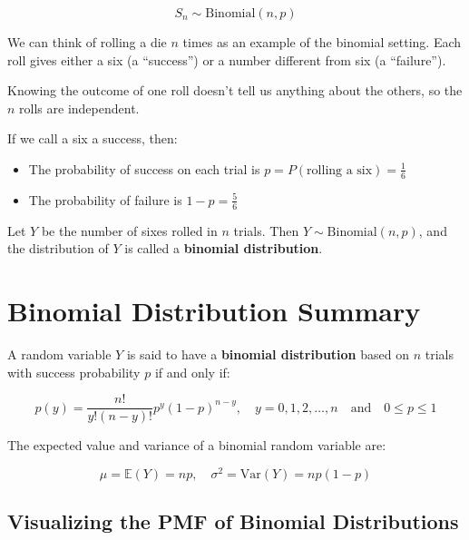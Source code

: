 \[
S_n \sim \text{Binomial}(n, p)
\]
\medskip
\begin{tcolorbox}[title=Example: Binomial Distribution from Die Rolls,
  colback=blue!5, colframe=blue!40!black, coltitle=black,
  colbacktitle=blue!10!white, fonttitle=\bfseries, breakable]

We can think of rolling a die \( n \) times as an example of the binomial setting. Each roll gives either a six (a “success”) or a number different from six (a “failure”).

Knowing the outcome of one roll doesn’t tell us anything about the others, so the \( n \) rolls are independent.

If we call a six a success, then:
\begin{itemize}
  \item The probability of success on each trial is \( p = P(\text{rolling a six}) = \frac{1}{6} \)
  \item The probability of failure is \( 1 - p = \frac{5}{6} \)
\end{itemize}

Let \( Y \) be the number of sixes rolled in \( n \) trials. Then \( Y \sim \text{Binomial}(n, p) \), and the distribution of \( Y \) is called a \textbf{binomial distribution}.
\end{tcolorbox}


\section{Binomial Distribution Summary} %

A random variable \( Y \) is said to have a \textbf{binomial distribution} based on \( n \) trials with success probability \( p \) if and only if:

\[
p(y) = \frac{n!}{y!(n - y)!} p^y (1 - p)^{n - y}, \quad y = 0, 1, 2, \dots, n \quad \text{and} \quad 0 \leq p \leq 1
\]

\medskip

The expected value and variance of a binomial random variable are:

\[
\mu = \mathbb{E}(Y) = np, \quad \sigma^2 = \mathrm{Var}(Y) = np(1 - p)
\]

\subsection{Visualizing the PMF of Binomial Distributions}

